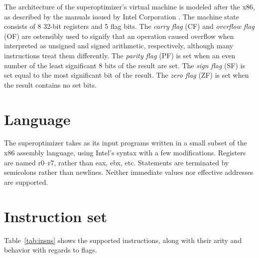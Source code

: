 \documentclass[a4paper,11pt]{kth-mag}
\begin{document}
The architecture of the superoptimizer's virtual machine is modeled after the x86, as described by the manuals issued by Intel Corporation \cite{intel_1,intel_2a,intel_2b}. %
The machine state consists of 8 32-bit registers and 5 flag bits.
The \emph{carry flag} (CF) and \emph{overflow flag} (OF) are ostensibly used to signify that an operation caused overflow when interpreted as unsigned and signed arithmetic, respectively, although many instructions treat them differently.
The \emph{parity flag} (PF) is set when an even number of the least significant 8 bits of the result are set.
The \emph{sign flag} (SF) is set equal to the most significant bit of the result.
The \emph{zero flag} (ZF) is set when the result contains no set bits.

\section{Language}

The superoptimizer takes as its input programs written in a small subset of the x86 assembly language, using Intel's syntax with a few modifications.
Registers are named r0--r7, rather than eax, ebx, etc.
Statements are terminated by semicolons rather than newlines.
Neither immediate values nor effective addresses are supported.

\section{Instruction set}

Table~\ref{tab:insns} shows the supported instructions, along with their arity and behavior with regards to flags.
\end{document}
